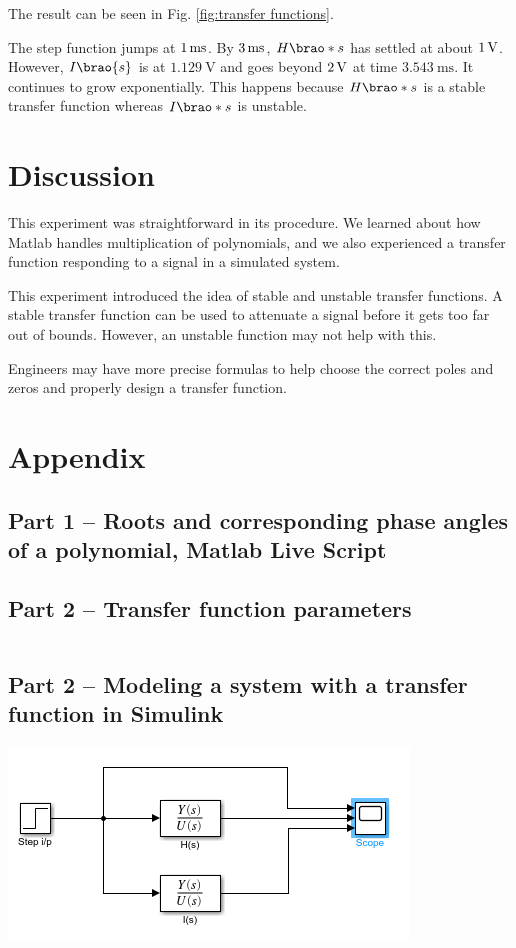 \documentclass[12pt]{article}
\DeclarePairedDelimiter\brao()%
\begin{document}
The result can be seen in Fig. \ref{fig:transfer functions}.

The step function jumps at $\SI1{\milli\second}$.
By $\SI3{\milli\second}$, $H\brao*s$ has settled at about $\SI1\volt$.
However, $I\brao{s}$ is at $\SI{1.129}\volt$ and goes beyond $\SI2\volt$ at time $\SI{3.543}{\milli\second}$.
It continues to grow exponentially.
This happens because $H\brao*s$ is a stable transfer function whereas $I\brao*s$ is unstable.

\section{Discussion}

This experiment was straightforward in its procedure.
We learned about how Matlab handles multiplication of polynomials,
and we also experienced a transfer function responding to a signal in a simulated system.

This experiment introduced the idea of stable and unstable transfer functions.
A stable transfer function can be used to attenuate a signal before it gets too far out of bounds.
However, an unstable function may not help with this.

Engineers may have more precise formulas to help choose the correct poles and zeros and properly design a transfer function.


\newpage
\appendix
\section{Appendix}
\subsection{Part 1 -- Roots and corresponding phase angles of a polynomial, Matlab Live Script}



\subsection{Part 2 -- Transfer function parameters}

\inputminted[]{matlab}{part02_01_transfer_function_params.m}

\subsection{Part 2 -- Modeling a system with a transfer function in Simulink}

\includegraphics[width=\linewidth]{part02_02_modeling_transfer_function_system_slx.png}
\end{document}
